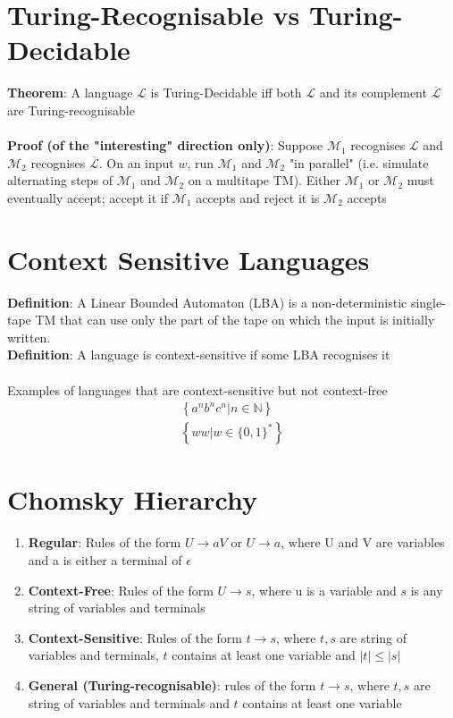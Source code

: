 \documentclass{article}[18pt]
\begin{document}
\section{Turing-Recognisable vs Turing-Decidable}
\textbf{Theorem}: A language $\mathscr{L}$ is Turing-Decidable iff both $\mathscr{L}$ and its complement $\overline{\mathscr{L}}$ are Turing-recognisable\\
\\
\textbf{Proof (of the "interesting" direction only)}: Suppose $\mathscr{M}_1$ recognises $\mathscr{L}$ and $\mathscr{M}_2$ recognises $\overline{\mathscr{L}}$. On an input $w$, run $\mathscr{M}_1$ and $\mathscr{M}_2$ "in parallel" (i.e. simulate alternating steps of $\mathscr{M}_1$ and $\mathscr{M}_2$ on a multitape TM). Either $\mathscr{M}_1$ or $\mathscr{M}_2$ must eventually accept; accept it if $\mathscr{M}_1$ accepts and reject it is $\mathscr{M}_2$ accepts
\section{Context Sensitive Languages}
\textbf{Definition}: A Linear Bounded Automaton (LBA) is a non-deterministic single-tape TM that can use only the part of the tape on which the input is initially written.\\
\textbf{Definition}: A language is context-sensitive if some LBA recognises it\\
\\
Examples of languages that are context-sensitive but not context-free
\[
\begin{array}{l}{\left\{a^{n} b^{n} c^{n} | n \in \mathbb{N}\right\}} \\ {\left\{w w | w \in\{0,1\}^{*}\right\}}\end{array}
\]
\section{Chomsky Hierarchy}
\begin{enumerate}
	\item \textbf{Regular}: Rules of the form $U\rightarrow aV$ or $U\rightarrow a$, where U and V are variables and a is either a terminal of $\epsilon$
	\item \textbf{Context-Free}: Rules of the form $U\rightarrow s$, where u is a variable and $s$ is any string of variables and terminals
	\item \textbf{Context-Sensitive}: Rules of the form $t\rightarrow s$, where $t,s $ are string of variables and terminals, $t$ contains at least one variable and $|t|\leqslant |s|$
	\item \textbf{General (Turing-recognisable)}: rules of the form $t\rightarrow s$, where $t, s$ are string of variables and terminals and $t$ contains at least one variable
\end{enumerate}
\end{document}
